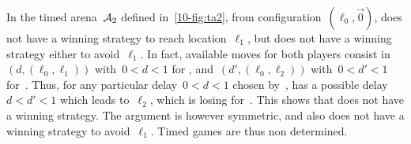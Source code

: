\begin{example}
  In the timed arena~$\mathcal{A}_2$ defined in~\cref{10-fig:ta2}, from configuration~$(\ell_0,\vec{0})$, \Eve does not have a winning strategy to reach location~$\ell_1$, but \Adam does not have a winning strategy either to avoid~$\ell_1$.
  In fact, available moves for both players consist in~$(d,(\ell_0,\ell_1))$ with~$0< d<1$ for \Eve, and~$(d',(\ell_0,\ell_2))$ with~$0< d' < 1$ for~\Adam.
  Thus, for any particular delay~$0<d<1$ chosen by~\Eve, \Adam has a possible delay $d<d'<1$ which leads to~$\ell_2$, which is losing for~\Eve.
  This shows that \Eve does not have a winning strategy.
  The argument is however symmetric, and \Adam also does not have a winning strategy to avoid~$\ell_1$.
  Timed games are thus non determined.
\end{example}













